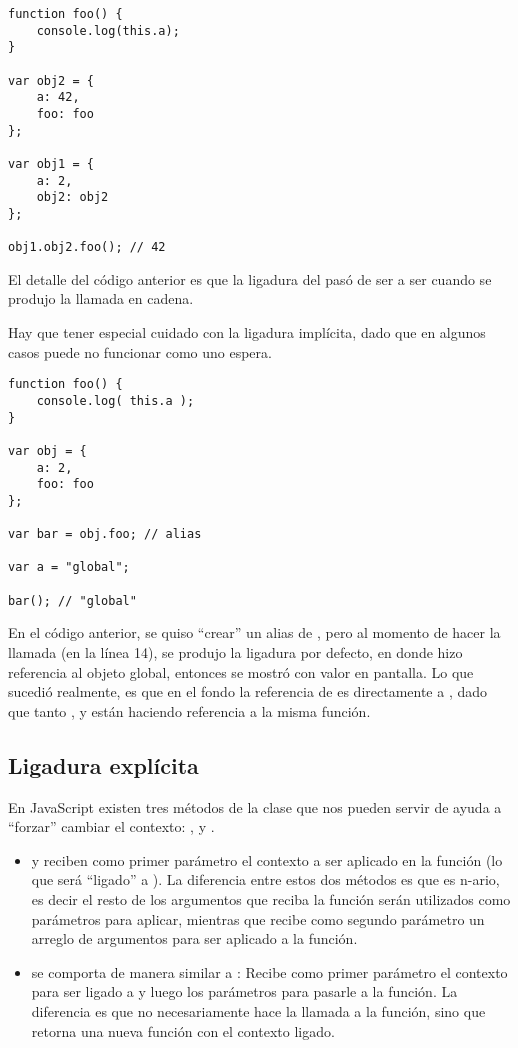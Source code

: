 \begin{lstlisting}
function foo() {
	console.log(this.a);
}

var obj2 = {
	a: 42,
	foo: foo
};

var obj1 = {
	a: 2,
	obj2: obj2
};

obj1.obj2.foo(); // 42
\end{lstlisting}

El detalle del código anterior es que la ligadura del  pasó de ser  a ser  cuando se produjo la llamada en cadena.

Hay que tener especial cuidado con la ligadura implícita, dado que en algunos casos puede no funcionar como uno espera.

\begin{lstlisting}
function foo() {
	console.log( this.a );
}

var obj = {
	a: 2,
	foo: foo
};

var bar = obj.foo; // alias

var a = "global";

bar(); // "global"
\end{lstlisting}

En el código anterior, se quiso "`crear"'  un alias de , pero al momento de hacer la llamada (en la línea 14), se produjo la ligadura por defecto, en donde  hizo referencia al objeto global, entonces se mostró  con valor  en pantalla. Lo que sucedió realmente, es que en el fondo la referencia de  es directamente a , dado que tanto ,  y  están haciendo referencia a la misma función.

\subsection{Ligadura explícita}
\label{subsec:ligaduraexplicita}

En JavaScript existen tres métodos de la clase  que nos pueden servir de ayuda a "`forzar"' cambiar el contexto: ,  y .

\begin{itemize}
\item {} y  reciben como primer parámetro el contexto a ser aplicado en la función (lo que será "`ligado"' a ). La diferencia entre estos dos métodos es que  es n-ario, es decir el resto de los argumentos que reciba la función serán utilizados como parámetros para aplicar, mientras que  recibe como segundo parámetro un arreglo de argumentos para ser aplicado a la función.
\item {} se comporta de manera similar a : Recibe como primer parámetro el contexto para ser ligado a  y luego los parámetros para pasarle a la función. La diferencia es que  no necesariamente hace la llamada a la función, sino que retorna una nueva función con el contexto ligado.
\end{itemize}

